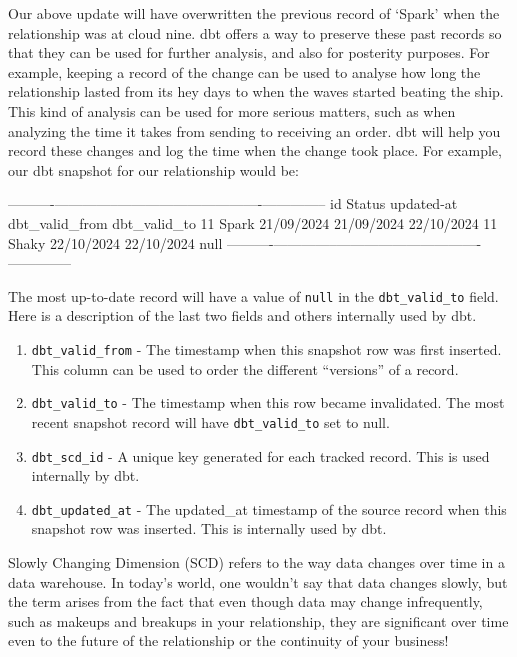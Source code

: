 \documentclass[
]{book}
\begin{document}
Our above update will have overwritten the previous record of `Spark' when the relationship was at cloud nine. dbt offers a way to preserve these past records so that they can be used for further analysis, and also for posterity purposes. For example, keeping a record of the change can be used to analyse how long the relationship lasted from its hey days to when the waves started beating the ship. This kind of analysis can be used for more serious matters, such as when analyzing the time it takes from sending to receiving an order. dbt will help you record these changes and log the time when the change took place. For example, our dbt snapshot for our relationship would be:

\textbar----------\textbar--------------\textbar---------------\textbar----------------\textbar--------------\textbar{}
\textbar{} id \textbar{} Status \textbar{} updated-at \textbar{} dbt\_valid\_from \textbar{} dbt\_valid\_to \textbar{}
\textbar{} 11 \textbar{} Spark \textbar{} 21/09/2024 \textbar{} 21/09/2024 \textbar{} 22/10/2024 \textbar{}
\textbar{} 11 \textbar{} Shaky \textbar{} 22/10/2024 \textbar{} 22/10/2024 \textbar{} null \textbar{}
\textbar----------\textbar--------------\textbar---------------\textbar----------------\textbar--------------\textbar{}

The most up-to-date record will have a value of \texttt{null} in the \texttt{dbt\_valid\_to} field. Here is a description of the last two fields and others internally used by dbt.

\begin{enumerate}
\def\labelenumi{\arabic{enumi}.}
\item
  \texttt{dbt\_valid\_from} - The timestamp when this snapshot row was first inserted. This column can be used to order the different ``versions'' of a record.
\item
  \texttt{dbt\_valid\_to} - The timestamp when this row became invalidated. The most recent snapshot record will have \texttt{dbt\_valid\_to} set to null.
\item
  \texttt{dbt\_scd\_id} - A unique key generated for each tracked record. This is used internally by dbt.
\item
  \texttt{dbt\_updated\_at} - The updated\_at timestamp of the source record when this snapshot row was inserted. This is internally used by dbt.
\end{enumerate}

Slowly Changing Dimension (SCD) refers to the way data changes over time in a data warehouse. In today's world, one wouldn't say that data changes slowly, but the term arises from the fact that even though data may change infrequently, such as makeups and breakups in your relationship, they are significant over time even to the future of the relationship or the continuity of your business!
\end{document}
